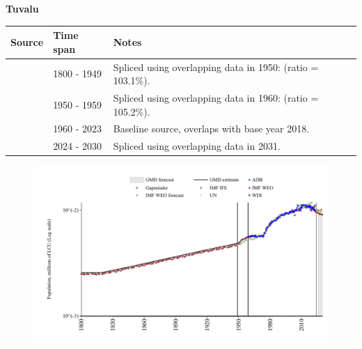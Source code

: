 \documentclass[12pt,a4paper,landscape]{article}
\begin{document}
\begin{adjustbox}{max totalsize={\paperwidth}{\paperheight},center}
\begin{minipage}[t][\textheight][t]{\textwidth}
\vspace*{0.5cm}
{}
\begin{center}
{\Large\bfseries Tuvalu}
\end{center}
\vspace{0.5cm}
\begin{table}[H]
\centering
\small
\begin{tabular}{|l|l|l|}
\hline
\textbf{Source} & \textbf{Time span} & \textbf{Notes} \\
\hline
\rowcolor{white}\cite{Gapminder}& 1800 - 1949 &Spliced using overlapping data in 1950: (ratio = 103.1\%).\\
\rowcolor{lightgray}\cite{IMF_IFS}& 1950 - 1959 &Spliced using overlapping data in 1960: (ratio = 105.2\%).\\
\rowcolor{white}\cite{WDI}& 1960 - 2023 &Baseline source, overlaps with base year 2018.\\
\rowcolor{lightgray}\cite{Gapminder}& 2024 - 2030 &Spliced using overlapping data in 2031.\\
\hline
\end{tabular}
\end{table}
\begin{figure}[H]
\centering
\includegraphics[width=\textwidth,height=0.6\textheight,keepaspectratio]{graphs/TUV_pop.pdf}
\end{figure}
\end{minipage}
\end{adjustbox}
\end{document}
